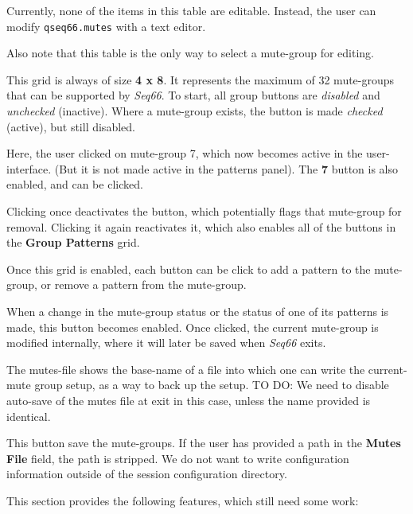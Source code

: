    Currently, none of the items in this table are editable.
   Instead, the user can modify \texttt{qseq66.mutes} with a text editor.

   Also note that this table is the only way to select a mute-group for editing.

   This grid is always of size \textbf{4 x 8}.  It represents the maximum of 32
   mute-groups that can be supported by \textsl{Seq66}.
   To start, all group buttons are \textsl{disabled} and
   \textsl{unchecked} (inactive).
   Where a mute-group exists, the button is made \textsl{checked} (active),
   but still disabled.

   Here, the user clicked on mute-group 7, which now becomes active in the
   user-interface.  (But it is not made active in the patterns panel).
   The \textbf{7} button is also enabled, and can be clicked.

   Clicking once deactivates the button, which potentially flags that mute-group
   for removal.  Clicking it again reactivates it, which also enables all of the
   buttons in the \textbf{Group Patterns} grid.

   Once this grid is enabled, each button can be click to add a pattern to the
   mute-group, or remove a pattern from the mute-group.

   When a change in the mute-group status or the status of one of its patterns is
   made, this button becomes enabled.  Once clicked, the current mute-group is
   modified internally, where it will later be saved when \textsl{Seq66} exits.

   The mutes-file shows the base-name of a file into which one can write the
   current-mute group setup, as a way to back up the setup.
   TO DO:  We need to disable auto-save of the mutes file at exit in this case,
   unless the name provided is identical.

   This button save the mute-groups.
   If the user has provided a path in the \textbf{Mutes File} field, the path is
   stripped.  We do not want to write configuration information outside of the
   session configuration directory.

   This section provides the following features, which still need some work:

